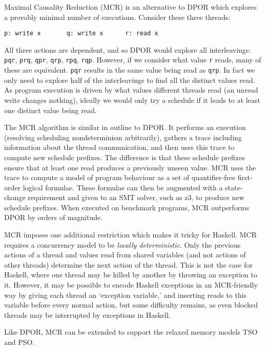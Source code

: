 Maximal Causality Reduction (MCR)\cite{huang2015,huang2017} is an alternative to
DPOR which explores a provably minimal number of executions.  Consider these
three threads:

\begin{center}
\verb|p: write x       q: write x      r: read x|
\end{center}

All three actions are dependent, and so DPOR would explore all interleavings:
\texttt{pqr}, \texttt{prq}, \texttt{qpr}, \texttt{qrp}, \texttt{rpq}, \texttt{rqp}.
However, if we consider what value \texttt{r} reads, many of these are
equivalent.  \texttt{pqr} results in the same value being read as \texttt{qrp}.
In fact we only need to explore half of the interleavings to find all the
distinct values read.  As program execution is driven by what values different
threads read (an unread write changes nothing), ideally we would only try a
schedule if it leads to at least one distinct value being read.

The MCR algorithm is similar in outline to DPOR\@.  It performs an execution
(resolving scheduling nondeterminism arbitrarily), gathers a trace including
information about the thread communication, and then uses this trace to compute
new schedule prefixes.  The difference is that these schedule prefixes ensure
that at least one read produces a previously unseen value.  MCR uses the trace
to compute a model of program behaviour as a set of quantifier-free first-order
logical formulae.  These formulae can then be augmented with a state-change
requirement and given to an SMT solver, such as z3, to produce new schedule
prefixes.  When executed on benchmark programs, MCR outperforms DPOR by orders
of magnitude\cite{huang2017}.

MCR imposes one additional restriction which makes it tricky for
Haskell.  MCR requires a concurrency model to be \emph{locally
  deterministic}\cite{huang2015}.  Only the previous actions of a
thread and values read from shared variables (and not actions of other
threads) determine the next action of the thread.  This is not the
case for Haskell, where one thread may be killed by another by
throwing an exception to it.  However, it may be possible to encode
Haskell exceptions in an MCR-friendly way by giving each thread an
`exception variable,' and inserting reads to this variable before
every normal action, but some difficulty remains, as even blocked
threads may be interrupted by exceptions in Haskell.

Like DPOR, MCR can be extended to support the relaxed memory models TSO and
PSO\cite{huang2016}.

